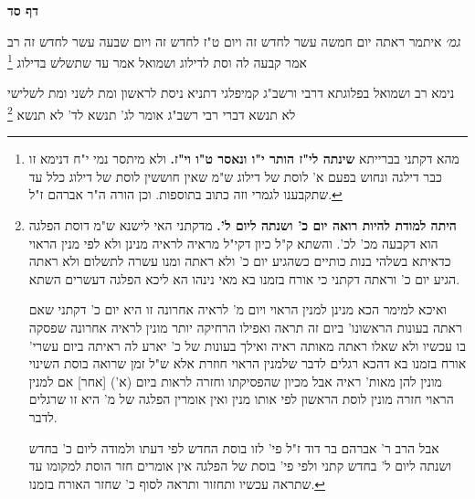 \documentclass[12pt, openany]{book}
\newcommand{\sethebfont}{
\fontsize{10.5pt}{21.0pt} \selectfont
}
\newcommand{\twocol}[1]{
	{\sethebfont \begin{multicols}{2}
			#1
	\end{multicols}}	
}
\newcommand{\sectname}{}
\newcommand{\newsection}[1]{
	\addcontentsline{toc}{section}{#1}
	\renewcommand{\sectname}{#1}	
	\vspace{-\baselineskip}
	\begin{center}
		\textbf{%
\fontsize{16pt}{16pt}\selectfont
			#1}
	\end{center}
	\vspace{-\baselineskip}
	\nopagebreak
}
\newcommand{\footnotecomment}[1]{\footnote{#1}}
\newcommand{\commenta}[1]{\footnotecomment{#1}}
\begin{document}
\newsection{דף סד}
\twocol{{\large\emph{גמ׳}} איתמר ראתה יום חמשה עשר לחדש זה ויום ט"ז לחדש זה ויום שבעה עשר לחדש זה רב אמר  קבעה לה וסת לדילוג  ושמואל אמר  עד שתשלש בדילוג 
\commenta{מהא דקתני בברייתא \textbf{שינתה לי"ז הותר י"ו ונאסר ט"ו וי"ז.}  ולא מיתסר נמי י"ח דנימא זו כבר דילגה ונחוש בפעם א' לוסת של דילוג ש"מ שאין חוששין לוסת של דילוג כלל עד שתקבענו לגמרי וזה כתוב בתוספות. וכן הורה ה"ר אברהם ז"ל. }

נימא רב ושמואל בפלוגתא דרבי ורשב"ג קמיפלגי  דתניא ניסת לראשון ומת לשני ומת לשלישי לא תנשא דברי רבי  רשב"ג אומר  לג' תנשא לד' לא תנשא 
\commenta{\textbf{היתה למודת להיות רואה יום כ' ושנתה ליום ל'.}  מדקתני האי לישנא ש"מ דוסת הפלגה הוא דקבעה מכ' לכ'. והשתא ק"ל כיון דקי"ל מראיה לראיה מנינן ולא לפי מנין הראוי כדאיתא בשלהי בנות כותיים כשהגיע יום כ' ולא ראתה ומנו עשרה לתשלום ולא ראתה הגיע יום כ' וראתה דקתני כי אורח בזמנו בא מאי נינהו הא ליכא הפלגה דעשרים השתא.\par ואיכא למימר הכא מנינן למנין הראוי ויום מ' לראיה אחרונה זו היא יום כ' דקתני שאם ראתה בעונות הראשונו' ביום זה תראה ואפילו הרחיקה יותר מונין לראיה אחרונה שפסקה בו עכשיו ולא שאלו ראתה מאותה ראיה ואילך בעונות של כ' יארע לה ראיתה ביום עשרי' אורח בזמנו בא דהכא רגלים לדבר שלמנין הראוי חוזרת אלא ש"ל זמן שרואה בוסת השינוי מונין להן מאות' ראיה אבל מכיון שהפסיקתו וחזרה לראות ביום (א') [אחר] אם למנין הראוי חזרה מונין לוסת הראשון לפי אותו מנין ואין אומרין הפלגה של מ' היא זו שרגלים לדבר.\par  אבל הרב ר' אברהם בר דוד ז"ל פי' לזו בוסת החדש לפי דעתו ולמודה ליום כ' בחדש ושנתה ליום ל' בחדש קתני ולפי פי' בוסת של הפלגה אין אומרים חזר הוסת למקומו עד שתראה עכשיו ותחזור ותראה לסוף כ' שחזר האורח בזמנו. }

}
\end{document}
